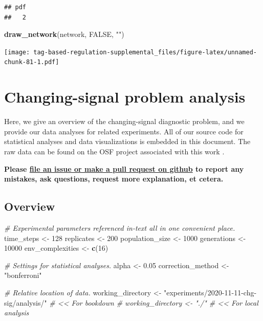 \documentclass[
]{book}
\newenvironment{Shaded}{\begin{snugshade}}{\end{snugshade}}
\newcommand{\CommentTok}[1]{\textcolor[rgb]{0.56,0.35,0.01}{\textit{#1}}}
\newcommand{\DecValTok}[1]{\textcolor[rgb]{0.00,0.00,0.81}{#1}}
\newcommand{\FloatTok}[1]{\textcolor[rgb]{0.00,0.00,0.81}{#1}}
\newcommand{\KeywordTok}[1]{\textcolor[rgb]{0.13,0.29,0.53}{\textbf{#1}}}
\newcommand{\NormalTok}[1]{#1}
\newcommand{\OtherTok}[1]{\textcolor[rgb]{0.56,0.35,0.01}{#1}}
\newcommand{\StringTok}[1]{\textcolor[rgb]{0.31,0.60,0.02}{#1}}
\begin{document}
\begin{verbatim}
## pdf 
##   2
\end{verbatim}

\begin{Shaded}
\begin{Highlighting}[]
\KeywordTok{draw\_network}\NormalTok{(network, }\OtherTok{FALSE}\NormalTok{, }\StringTok{""}\NormalTok{)}
\end{Highlighting}
\end{Shaded}

\texttt{[image: tag-based-regulation-supplemental\_files/figure-latex/unnamed-chunk-81-1.pdf]}

\hypertarget{changing-signal-problem-analysis}{%
\chapter{Changing-signal problem analysis}\label{changing-signal-problem-analysis}}

Here, we give an overview of the changing-signal diagnostic problem, and we provide our data analyses for related experiments.
All of our source code for statistical analyses and data visualizations is embedded in this document.
The raw data can be found on the OSF project associated with this work \citep{Lalejini_Moreno_Ofria_Data_2020}.

\textbf{Please \href{https://github.com/amlalejini/Tag-based-Genetic-Regulation-for-LinearGP/issues}{file an issue or make a pull request on github} to report any mistakes, ask questions, request more explanation, et cetera.}

\hypertarget{overview-3}{%
\section{Overview}\label{overview-3}}

\begin{Shaded}
\begin{Highlighting}[]
\CommentTok{\# Experimental parameters referenced in{-}text all in one convenient place.}
\NormalTok{time\_steps \textless{}{-}}\StringTok{ }\DecValTok{128}
\NormalTok{replicates \textless{}{-}}\StringTok{ }\DecValTok{200}
\NormalTok{population\_size \textless{}{-}}\StringTok{ }\DecValTok{1000}
\NormalTok{generations \textless{}{-}}\StringTok{ }\DecValTok{10000}
\NormalTok{env\_complexities \textless{}{-}}\StringTok{ }\KeywordTok{c}\NormalTok{(}\DecValTok{16}\NormalTok{)}

\CommentTok{\# Settings for statistical analyses.}
\NormalTok{alpha \textless{}{-}}\StringTok{ }\FloatTok{0.05}
\NormalTok{correction\_method \textless{}{-}}\StringTok{ "bonferroni"}

\CommentTok{\# Relative location of data.}
\NormalTok{working\_directory \textless{}{-}}\StringTok{ "experiments/2020{-}11{-}11{-}chg{-}sig/analysis/"} \CommentTok{\# \textless{}\textless{} For bookdown}
\CommentTok{\# working\_directory \textless{}{-} "./"                                     \# \textless{}\textless{} For local analysis}
\end{Highlighting}
\end{Shaded}
\end{document}
